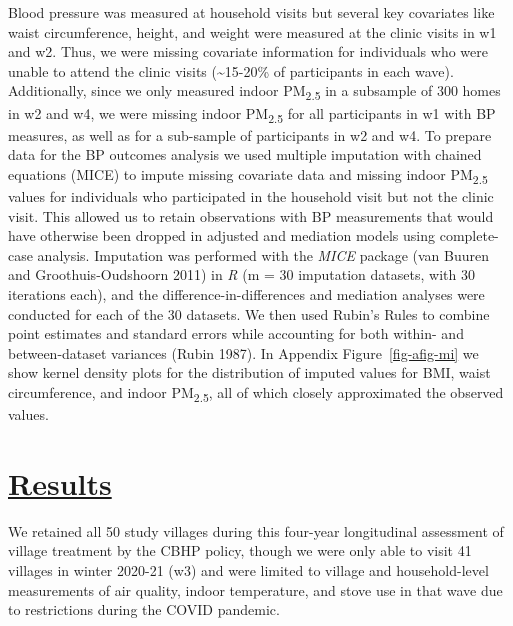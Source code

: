 \documentclass[
  letterpaper,
  DIV=11,
  numbers=noendperiod]{scrartcl}
\providecommand{\DIFadd}[1]{{\protect\color{blue}\underline{#1}}} %
\providecommand{\DIFaddbegin}{} %
\providecommand{\DIFaddend}{} %
\providecommand{\DIFdelbegin}{} %
\providecommand{\DIFdelend}{} %
\newcommand{\DIFscaledelfig}{0.5}
\newlength{\DIFdelgraphicswidth} %
\newlength{\DIFdelgraphicsheight} %
\newcommand{\DIFaddincludegraphics}[2][]{{\color{blue}\fbox{\DIFOincludegraphics[#1]{#2}}}} %
\newcommand{\DIFdelincludegraphics}[2][]{%
\sbox{\DIFdelgraphicsbox}{\DIFOincludegraphics[#1]{#2}}%
\settoboxwidth{\DIFdelgraphicswidth}{\DIFdelgraphicsbox} %
\settoboxtotalheight{\DIFdelgraphicsheight}{\DIFdelgraphicsbox} %
\scalebox{\DIFscaledelfig}{%
\parbox[b]{\DIFdelgraphicswidth}{\usebox{\DIFdelgraphicsbox}\\[-\baselineskip] \rule{\DIFdelgraphicswidth}{0em}}\llap{\resizebox{\DIFdelgraphicswidth}{\DIFdelgraphicsheight}{%
\setlength{\unitlength}{\DIFdelgraphicswidth}%
\begin{picture}(1,1)%
\thicklines\linethickness{2pt} %
{\color[rgb]{1,0,0}\put(0,0){\framebox(1,1){}}}%
{\color[rgb]{1,0,0}\put(0,0){\line( 1,1){1}}}%
{\color[rgb]{1,0,0}\put(0,1){\line(1,-1){1}}}%
\end{picture}%
}\hspace*{3pt}}} %
} %
\DeclareRobustCommand{\DIFaddbegin}{\DIFOaddbegin \let\includegraphics\DIFaddincludegraphics} %
\DeclareRobustCommand{\DIFaddend}{\DIFOaddend \let\includegraphics\DIFOincludegraphics} %
\DeclareRobustCommand{\DIFdelbegin}{\DIFOdelbegin \let\includegraphics\DIFdelincludegraphics} %
\DeclareRobustCommand{\DIFdelend}{\DIFOaddend \let\includegraphics\DIFOincludegraphics} %
\begin{document}
Blood pressure was measured at household visits but several key
covariates like waist circumference, height, and weight were measured at
the clinic visits in w1 and w2. Thus, we were missing covariate
information for individuals who were unable to attend the clinic visits
(\textasciitilde15-20\% of participants in each wave). Additionally,
since we only measured indoor PM\textsubscript{2.5} in a subsample of
300 homes in w2 and w4, we were missing indoor PM\textsubscript{2.5} for
all participants in w1 with BP measures, as well as for a sub-sample of
participants in w2 and w4. To prepare data for the BP outcomes analysis
we used multiple imputation with chained equations (MICE) to impute
missing covariate data and missing indoor PM\textsubscript{2.5} values
for individuals who participated in the household visit but not the
clinic visit. This allowed us to retain observations with BP
measurements that would have otherwise been dropped in adjusted and
mediation models using complete-case analysis. Imputation was performed
with the \emph{MICE} package (van Buuren and Groothuis-Oudshoorn 2011)
in \emph{R} (m = 30 imputation datasets, with 30 iterations each), and
the difference-in-differences and mediation analyses were conducted for
each of the 30 datasets. We then used Rubin's Rules to combine point
estimates and standard errors while accounting for both within- and
between-dataset variances (Rubin 1987). In Appendix
Figure~\ref{fig-afig-mi} we show kernel density plots for the
distribution of imputed values for BMI, waist circumference, and indoor
PM\textsubscript{2.5}, all of which closely approximated the observed
values.

\DIFdelbegin %
\DIFdelend \DIFaddbegin \section{\DIFadd{Results}}\label{results-1}
\DIFaddend 

We retained all 50 study villages during this four-year longitudinal
assessment of village treatment by the CBHP policy, though we were only
able to visit 41 villages in winter 2020-21 (w3) and were limited to
village and household-level measurements of air quality, indoor
temperature, and stove use in that wave due to restrictions during the
COVID pandemic.
\end{document}
